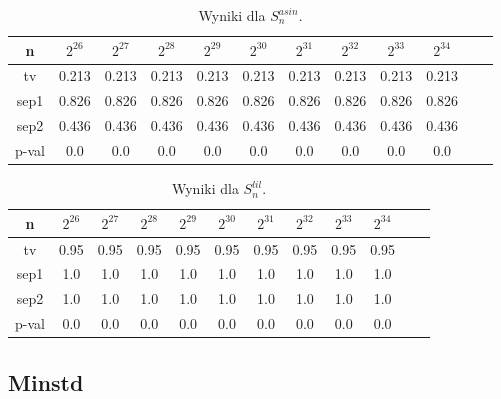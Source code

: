 \documentclass[a4paper,11pt,twoside]{book}
\newcommand{\Slil}[1]{S^{lil}_#1}
\newcommand{\Sasin}[1]{S^{asin}_#1}
\theoremstyle{definition}
\begin{document}
\begin{table}[ht!]
\centering
 \caption{Wyniki dla $\Sasin{n}$.}
 \label{tab:bsd_asin}
\begin{tabular} {||c|c|c|c|c|c|c|c|c|c|c|c||}  
 \hline
     n &  $2^{26}$ &  $2^{27}$ &  $2^{28}$ &  $2^{29}$ &  $2^{30}$ &  $2^{31}$ &  $2^{32}$ &  $2^{33}$ &  $2^{34}$\\ \hline
    tv &  0.213 &  0.213 &  0.213 &  0.213 &  0.213 &  0.213 &  0.213 &  0.213 &  0.213\\ \hline
  sep1 &  0.826 &  0.826 &  0.826 &  0.826 &  0.826 &  0.826 &  0.826 &  0.826 &  0.826\\ \hline
  sep2 &  0.436 &  0.436 &  0.436 &  0.436 &  0.436 &  0.436 &  0.436 &  0.436 &  0.436\\ \hline
 p-val &    0.0 &    0.0 &    0.0 &    0.0 &    0.0 &    0.0 &    0.0 &    0.0 &    0.0\\ \hline


 
\end{tabular}  
\end{table}
\begin{table}[ht!]
\centering
 \caption{Wyniki dla $\Slil{n}$.}
 \label{tab:bsd_lil}
\begin{tabular} {||c|c|c|c|c|c|c|c|c|c|c|c||}  
 \hline 
     n &  $2^{26}$ &  $2^{27}$ &  $2^{28}$ &  $2^{29}$ &  $2^{30}$ &  $2^{31}$ &  $2^{32}$ &  $2^{33}$ &  $2^{34}$\\ \hline
    tv &   0.95 &   0.95 &   0.95 &   0.95 &   0.95 &   0.95 &   0.95 &   0.95 &   0.95\\ \hline
  sep1 &    1.0 &    1.0 &    1.0 &    1.0 &    1.0 &    1.0 &    1.0 &    1.0 &    1.0\\ \hline
  sep2 &    1.0 &    1.0 &    1.0 &    1.0 &    1.0 &    1.0 &    1.0 &    1.0 &    1.0\\ \hline
 p-val &    0.0 &    0.0 &    0.0 &    0.0 &    0.0 &    0.0 &    0.0 &    0.0 &    0.0\\ \hline

 
\end{tabular}  
\end{table}
\FloatBarrier
\subsection{Minstd}
\end{document}
